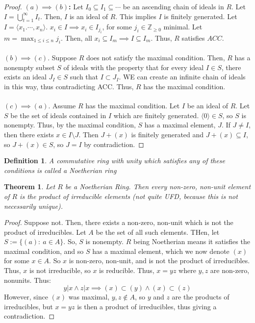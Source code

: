 \documentclass{article}
\newcommand{\Z}{\mathbb{Z}}
\newtheorem{theorem}{Theorem}[subsection]
\newtheorem{definition}{Definition}[subsection]
\begin{document}
      \begin{proof}
      \textbf{$(a)\implies (b)$:} Let $I_0\subseteq I_1\subseteq \cdots$ be an ascending chain of ideals in $R$. Let $I=\displaystyle\bigcup_{t=1}^\infty I_t$. Then, $I$ is an ideal of $R$. This implies $I$ is finitely generated. Let $I=\langle x_1.\cdots, x_n\rangle$. $x_i\in I\implies x_i\in I_{j_i}$, for some $j_i\in\Z_{\geq 0}$ minimal. Let $m=\max_{1\leq i\leq n}{j_i}$. Then, all $x_i\subseteq I_m\implies I\subseteq I_m$. Thus, $R$ satisfies $ACC.$\\
      \\
      \textbf{$(b)\implies (c)$}. Suppose $R$ does not satisfy the maximal condition. Then, $R$ has a nonempty subset $S$ of ideals with the property that for every ideal $I\in S$, there exists an ideal $J_I\in S$ such that $I\subset J_I$. WE can create an infinite chain of ideals in this way, thus contradicting ACC. Thus, $R$ has the maximal condition.
      \\
      \\
      \textbf{$(c)\implies (a)$}. Assume $R$ has the maximal condition. Let $I$ be an ideal of $R$. Let $S$ be the set of ideals contained in $I$ which are finitely generated. $\langle 0\rangle\in S$, so $S$ is nonempty. Thus, by the maximal condition, $S$ has a maximal element, $J$. If $J\neq I$, then there exists $x\in I\setminus J$. Then $J+(x)$ is finitely generated and $J+(x)\subseteq I$, so $J+(x)\in S$, so $J=I$ by contradiction.
      \end{proof}
      \begin{definition}
      A commutative ring with unity which satisfies any of these conditions is called a Noetherian ring
      \end{definition}
      \begin{theorem}
      Let $R$ be a Noetherian Ring. Then every non-zero, non-unit element of $R$ is the product of irreducible elements (not quite UFD, because this is not necessarily unique).
      \end{theorem}
      \begin{proof}
      Suppose not. Then, there exists a non-zero, non-unit which is not the product of irreducibles. Let $A$ be the set of all such elements. THen, let $S:=\{(a):\ a\in A\}$. So, $S$ is nonempty. $R$ being Noetherian means it satisfies the maximal condition, and so $S$ has a maximal element, which we now denote $(x)$ for some $x\in A$. So $x$ is non-zero, non-unit, and is not the product of irreducibles. Thus, $x$ is not irreducible, so $x$ is reducible. Thus, $x=yz$ where $y,z$ are non-zero, nonunits. Thus: $$y|x\wedge z|x\implies (x)\subset (y)\wedge (x)\subset (z)$$
      However, since $(x)$ was maximal, $y,z\not\in A$, so $y$ and $z$ are the products of irreducibles, but $x=yz$ is then a product of irreducibles, thus giving a contradiction. 
      \end{proof}
\end{document}
